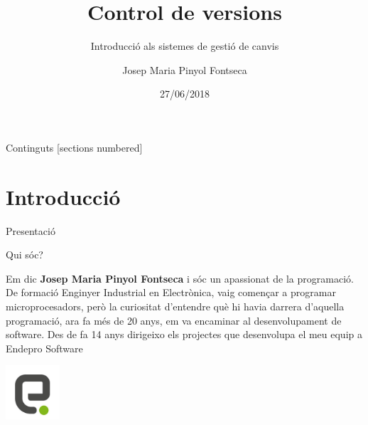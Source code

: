 \documentclass[10pt,xcolor={rgb}]{beamer}
\title{Control de versions}
\subtitle{Introducció als sistemes de gestió de canvis}
\date{27/06/2018}
\author{Josep Maria Pinyol Fontseca}
\institute{Endepro Software, S.L.}
\begin{document}
    \maketitle
    
    \begin{frame}{Continguts}
      [sections numbered]
      \tableofcontents[hideallsubsections]
    \end{frame}
    
    
    \section{Introducció}    
    
    \begin{frame}[fragile]{Presentació}

      \begin{block}{Qui sóc?}

        Em dic \textbf{Josep Maria Pinyol Fontseca} i sóc un apassionat de la programació. De formació Enginyer Industrial en Electrònica, vaig començar a programar microprocesadors, però la curiositat d’entendre què hi havia darrera d’aquella programació, ara fa més de 20 anys, em va encaminar al desenvolupament de software. Des de fa 14 anys dirigeixo els projectes que desenvolupa el meu equip a Endepro Software

        \centering
        \includegraphics[width=2cm, height=2cm]{endepro.png}
      \end{block}

    \end{frame}
\end{document}

